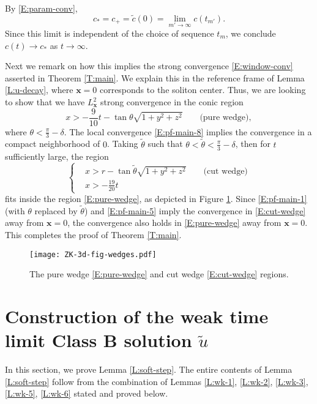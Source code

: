 \documentclass[12pt,letterpaper]{amsart}
\theoremstyle{remark}
\numberwithin{equation}{section}
\numberwithin{theorem}{section}
\numberwithin{table}{section}
\begin{document}
By \eqref{E:param-conv}, 
$$
c_* = c_+ = \tilde c(0) = \lim_{m'\to \infty} c(t_{m'}).
$$
Since this limit is independent of the choice of sequence $t_m$, we conclude $c(t) \to c_*$ as $t\to \infty$.  

Next we remark on how this implies the strong convergence \eqref{E:window-conv} asserted in Theorem \ref{T:main}.  We explain this in the reference frame of Lemma \ref{L:u-decay}, where $\mathbf{x}=0$ corresponds to the soliton center.  Thus, we are looking to show that we have $L_{\mathbf{x}}^2$ strong convergence in the conic region 
\begin{equation}
\label{E:pure-wedge}
x>-\frac{9}{10}t - \tan \theta \sqrt{1+y^2+z^2} \qquad \text{(pure wedge)},
\end{equation}
where $\theta< \frac{\pi}{3}-\delta$.  The local convergence \eqref{E:pf-main-8} implies the convergence in a compact neighborhood of $0$.  Taking $\tilde\theta$ such that $\theta < \tilde \theta < \frac{\pi}{3}-\delta$, then for $t$ sufficiently large, the region
\begin{equation}
\label{E:cut-wedge}
\left\{
\begin{aligned}
&x> r- \tan \tilde{\theta} \sqrt{1+y^2+z^2}  \qquad \text{(cut wedge)}
\\
& x> - \frac{19}{20}t
\end{aligned}
\right.
\end{equation}
fits inside the region \eqref{E:pure-wedge}, as depicted in Figure \ref{F:cut-cone}.  Since \eqref{E:pf-main-1} (with $\theta$ replaced by $\tilde \theta$) and \eqref{E:pf-main-5} imply the convergence in \eqref{E:cut-wedge} away from $\mathbf{x}=0$, the convergence also holds in \eqref{E:pure-wedge} away from $\mathbf{x}=0$.    This completes the proof of Theorem \ref{T:main}.

\begin{figure}
\texttt{[image: ZK-3d-fig-wedges.pdf]}
\caption{The pure wedge \eqref{E:pure-wedge} and cut wedge \eqref{E:cut-wedge} regions.}
\label{F:cut-cone}
\end{figure}


\section{Construction of the weak time limit Class B solution $\tilde u$}
\label{S:wk-lim}

In this section, we prove Lemma \ref{L:soft-step}.  The entire contents of Lemma \ref{L:soft-step} follow from the combination of Lemmas \ref{L:wk-1}, \ref{L:wk-2}, \ref{L:wk-3}, \ref{L:wk-5}, \ref{L:wk-6} stated and proved below.
\end{document}
